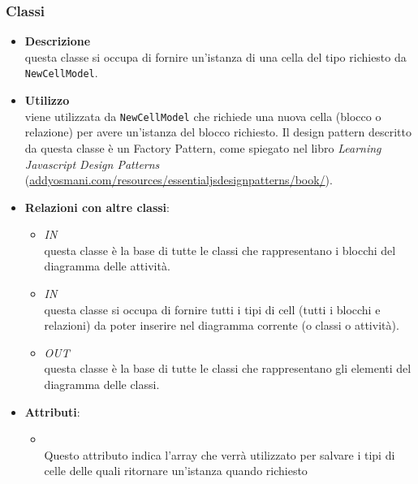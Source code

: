 \subsubsection{Classi}
\label{\nogloxy{swedesigner::client::model::NewCellFactory}}
\begin{itemize}
\item \textbf{Descrizione}\\
questa classe si occupa di fornire un'istanza di una cella del tipo richiesto da \texttt{NewCellModel}. 
\item \textbf{Utilizzo}\\
viene utilizzata da \texttt{NewCellModel} che richiede una nuova cella (blocco o relazione) per avere un'istanza del blocco richiesto. Il design pattern descritto da questa classe è un Factory Pattern, come spiegato nel libro \emph{Learning Javascript Design Patterns} (\url{addyosmani.com/resources/essentialjsdesignpatterns/book/}).
\item \textbf{Relazioni con altre classi}:
\begin{itemize}
\item \textit{IN} \hyperref[\nogloxy{swedesigner::client::model::celltypes::activity::ActivityDiagramElement}]{}\\
questa classe è la base di tutte le classi che rappresentano i blocchi del diagramma delle attività.
\item \textit{IN} \hyperref[\nogloxy{swedesigner::client::model::NewCellModel}]{}\\
questa classe si occupa di fornire tutti i tipi di cell (tutti i blocchi e relazioni) da poter inserire nel diagramma corrente (o classi o attività).
\item \textit{OUT} \hyperref[\nogloxy{swedesigner::client::model::celltypes::class::ClassDiagramElement}]{}\\
questa classe è la base di tutte le classi che rappresentano gli elementi del diagramma delle classi.
\end{itemize}
\item \textbf{Attributi}:
\begin{itemize}
\item {}
\\ Questo attributo indica l'array che verrà utilizzato per salvare i tipi di celle delle quali ritornare un'istanza quando richiesto

\end{itemize}
\end{itemize}
